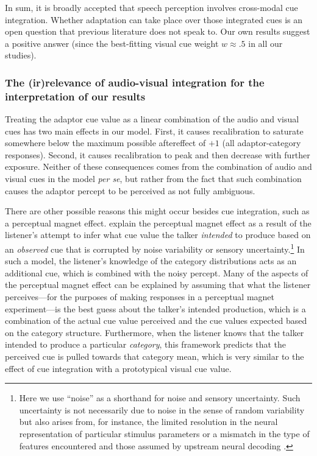 In sum, it is broadly accepted that speech perception involves cross-modal cue integration. Whether adaptation can take place over those integrated cues is an open question that previous literature does not speak to. Our own results suggest a positive answer (since the best-fitting visual cue weight $w \approx .5$ in all our studies). 


\subsubsection{The (ir)relevance of audio-visual integration for the interpretation of our results}
\label{sec:import-audio-visu}

Treating the adaptor cue value as a linear combination of the audio and visual cues has two main effects in our model.  First, it causes recalibration to saturate somewhere below the maximum possible aftereffect of $+1$ (all adaptor-category responses).  Second, it causes recalibration to peak and then decrease with further exposure.  Neither of these consequences comes from the combination of audio and visual cues in the model \emph{per se}, but rather from the fact that such combination causes the adaptor percept to be perceived as not fully ambiguous.

There are other possible reasons this might occur besides cue integration, such as a perceptual magnet effect.   explain the perceptual magnet effect as a result of the listener's attempt to infer what cue value the talker \emph{intended} to produce based on an \emph{observed} cue that is corrupted by noise variability or sensory uncertainty.\footnote{Here we use ``noise'' as a shorthand for noise and sensory uncertainty.  Such uncertainty is not necessarily due to noise in the sense of random variability but also arises from, for instance, the limited resolution in the neural representation of particular stimulus parameters or a mismatch in the type of features encountered and those assumed by upstream neural decoding \protect\cite{Beck2012}.}  In such a model, the listener's knowledge of the category distributions acts as an additional cue, which is combined with the noisy percept.  Many of the aspects of the perceptual magnet effect can be explained by assuming that what the listener perceives---for the purposes of making responses in a perceptual magnet experiment---is the best guess about the talker's intended production, which is a combination of the actual cue value perceived and the cue values expected based on the category structure.  Furthermore, when the listener knows that the talker intended to produce a particular \emph{category}, this framework predicts that the perceived cue is pulled towards that category mean, which is very similar to the effect of cue integration with a prototypical visual cue value.

